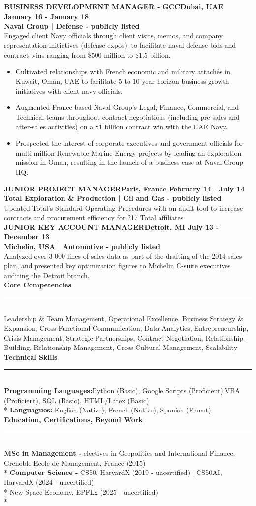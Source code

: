 \documentclass[a4paper]{article}
\newcommand{\MainTitle}[1]{\textbf{\Large{#1}}\\[-1ex] \rule{\linewidth}{0.5mm}\\}
\newcommand{\JobTitle}[3]{\textbf{\color{MyBlue}\MakeUppercase{#1}\small{\hfill \textbf{#2} \textbar  \textbf{#3}}}\\}
\newcommand{\Company}[1]{\textbf{#1} \\}
\newcommand{\ListTasks}[1]{
  \begin{itemize}[left=0pt]
    \vspace{-1ex}  
    \renewcommand{\labelitemi}{\textcolor{blue}{--}}
    \setlength{\itemsep}{-1ex}
    #1
  \end{itemize}
}
\begin{document}
\JobTitle{Business Development Manager - GCC}{Dubai, UAE}{January 16 - January 18}
\Company{Naval Group | Defense - publicly listed}
Engaged client Navy officials through client visits, memos, and company representation initiatives (defense expos), to facilitate naval defense bids and contract wins ranging from \$500 million to \$1.5 billion.
\ListTasks{
    \item Cultivated relationships with French economic and military attachés in Kuwait, Oman, UAE to facilitate 5-to-10-year-horizon business growth initiatives with client navy officials.
    \item Augmented France-based Naval Group's Legal, Finance, Commercial, and Technical teams throughout contract negotiations (including pre-sales and after-sales activities) on a \$1 billion contract win with the UAE Navy.
    \item Prospected the interest of corporate executives and government officials for multi-million Renewable Marine Energy projects by leading an exploration mission in Oman, resulting in the launch of a business case at Naval Group HQ.
}

\JobTitle{Junior Project Manager}{Paris, France}{February 14 - July 14}
\Company{Total Exploration \& Production | Oil and Gas - publicly listed}
Updated Total's Standard Operating Procedures with an audit tool to increase contracts and procurement efficiency for 217 Total affiliates
\\

\JobTitle{Junior Key Account Manager}{Detroit, MI}{July 13 - December 13}
\Company{Michelin, USA | Automotive - publicly listed}
Analyzed over 3 000 lines of sales data as part of the drafting of the 2014 sales plan, and presented key optimization figures to Michelin C-suite executives auditing the Detroit branch.
\\

\MainTitle{Core Competencies}
Leadership \& Team Management, Operational Excellence, Business Strategy \& Expansion, Cross-Functional Communication, Data Analytics, Entrepreneurship, Crisis Management, Strategic Partnerships, Contract Negotiation, Relationship-Building, Relationship Management, Cross-Cultural Management, Scalability
\\

\MainTitle{Technical Skills}
\textbf{Programming Languages:}Python (Basic),  Google Scripts (Proficient),VBA (Proficient), SQL (Basic), HTML/Latex (Basic)
\\*
\textbf{Languagues:} English (Native), French (Native), Spanish (Fluent)
\\

\MainTitle{Education, Certifications, Beyond Work}
\textbf{MSc in Management -} electives in Geopolitics and International Finance, Grenoble Ecole de Management, France (2015)
\\*
\textbf{Computer Science - }CS50, HarvardX (2019 - uncertified) | CS50AI, HarvardX (2024 - uncertified)
\\*
New Space Economy, EPFLx (2025 - uncertified) 
\\*
\end{document}
